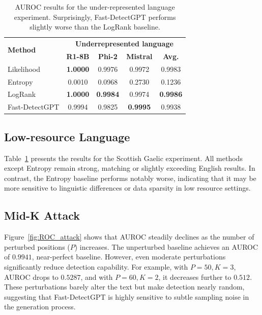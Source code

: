 \documentclass[11pt]{article}
\begin{document}
\begin{table}[h]
    \centering
    \small
    \begin{tabular}{l|ccc|c}
    \toprule
    \multirow{2}{*}{\textbf{Method}} & \multicolumn{4}{c}{\textbf{Underrepresented language}} \\
    \cmidrule{2-5}
    & \textbf{R1-8B} & \textbf{Phi-2} & \textbf{Mistral} & \textbf{Avg.} \\
    \midrule
    Likelihood & \textbf{1.0000} & 0.9976 & 0.9972 & 0.9983 \\
    Entropy & 0.0010 & 0.0968 & 0.2730 & 0.1236 \\
    LogRank & \textbf{1.0000} & \textbf{0.9984} & 0.9974 & \textbf{0.9986} \\
    \midrule
    Fast-DetectGPT & 0.9994 & 0.9825 & \textbf{0.9995} & 0.9938 \\
    \bottomrule
    \end{tabular}
    
    \caption{AUROC results for the under-represented language experiment. Surprisingly, Fast-DetectGPT performs slightly worse than the LogRank baseline.}
    \label{tab:scotgal_results}
\end{table}

\subsection{Low-resource Language}

Table~\ref{tab:scotgal_results} presents the results for the Scottish Gaelic experiment. All methods except Entropy remain strong, matching or slightly exceeding English results. In contrast, the Entropy baseline performs notably worse, indicating that it may be more sensitive to linguistic differences or data sparsity in low resource settings.

\subsection{Mid-K Attack}


Figure~\ref{fig:ROC_attack} shows that AUROC steadily declines as the number of perturbed positions ($P$) increases. The unperturbed baseline achieves an AUROC of $0.9941$, near-perfect baseline. However, even moderate perturbations significantly reduce detection capability. For example, with $P=50, K=3$, AUROC drops to $0.5287$, and with $P=60, K=2$, it decreases further to $0.512$. These perturbations barely alter the text but make detection nearly random, suggesting that Fast-DetectGPT is highly sensitive to subtle sampling noise in the generation process.
\end{document}
